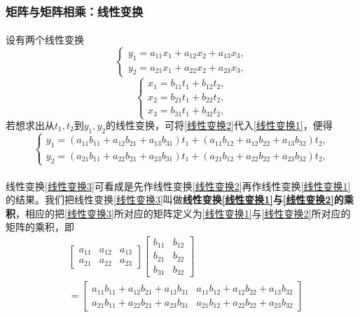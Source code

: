 \subsubsection{矩阵与矩阵相乘：线性变换}
\paragraph{}
设有两个线性变换
\begin{equation}
  \label{线性变换1}
  \left\{\begin{array}{c}
    y_1 = a_{11}x_1 + a_{12}x_2 + a_{13}x_3, \\
    y_2 = a_{21}x_1 + a_{22}x_2 + a_{23}x_3,
  \end{array} \right.
\end{equation}
\begin{equation}
  \label{线性变换2}
  \left\{\begin{array}{c}
    x_1 = b_{11}t_1 + b_{12}t_2, \\
    x_2 = b_{21}t_1 + b_{22}t_2, \\
    x_3 = b_{31}t_1 + b_{32}t_2,
  \end{array} \right.
\end{equation}
若想求出从$t_1,t_2$到$y_1,y_2$的线性变换，可将\eqref{线性变换2}代入\eqref{线性变换1}，便得
\begin{equation}
  \label{线性变换3}
  \left\{\begin{array}{c}
    y_1 = (a_{11}b_{11} + a_{12}b_{21} + a_{13}b_{31})t_1 + (a_{11}b_{12} + a_{12}b_{22} + a_{13}b_{32})t_2, \\
    y_2 = (a_{21}b_{11} + a_{22}b_{21} + a_{23}b_{31})t_1 + (a_{21}b_{12} + a_{22}b_{22} + a_{23}b_{32})t_2,
  \end{array} \right.
\end{equation}

\paragraph{}
线性变换\eqref{线性变换3}可看成是先作线性变换\eqref{线性变换2}再作线性变换\eqref{线性变换1}的结果。我们把线性变换\eqref{线性变换3}叫做\textbf{线性变换\eqref{线性变换1}与\eqref{线性变换2}的乘积}，相应的把\eqref{线性变换3}所对应的矩阵定义为\eqref{线性变换1}与\eqref{线性变换2}所对应的矩阵的乘积，即
\begin{align*}
& \left[\begin{array}{ccc}
  a_{11} & a_{12} & a_{13} \\
  a_{21} & a_{22} & a_{23}
\end{array}\right]\left[\begin{array}{cc}
  b_{11} & b_{12} \\
  b_{21} & b_{22} \\
  b_{31} & b_{32}
\end{array}\right] \\
& = \left[\begin{array}{cc}
  a_{11}b_{11} + a_{12}b_{21} + a_{13}b_{31} & a_{11}b_{12} + a_{12}b_{22} + a_{13}b_{32} \\
  a_{21}b_{11} + a_{22}b_{21} + a_{23}b_{31} & a_{21}b_{12} + a_{22}b_{22} + a_{23}b_{32}
\end{array}\right]
\end{align*}

